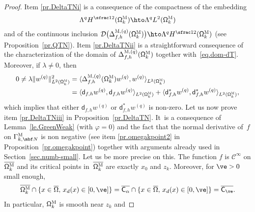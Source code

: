 \begin{proof}
Item \eqref{pr.DeltaTNi} is a consequence of the compactness
of the embedding\vspace*{-3pt}\enlargethispage{\baselineskip}
\[
\Lambda^q H^{\sfrac12} (\mathsf \Omega_k^{\textsc{M}})\hto
\Lambda^qL^{2} (\mathsf \Omega_k^{\textsc{M}})
\]
and of the
continuous inclusion $\mathcal D\bigl(\Delta_{f,h}^{\textsc{M},(q)} (\mathsf \Omega_k^{\textsc{M}})\bigr) \hto
\Lambda^qH^{\sfrac12} (\mathsf \Omega_k^{\textsc{M}})$ (see Proposition~\ref{pr.QTN}).
Item \eqref{pr.DeltaTNii} is a straightforward consequence
of the characterization of the domain of $\Delta_{f,h}^{\textsc{M},(q)} (\mathsf \Omega_k^{\textsc{M}})$
together with~\eqref{eq.dom-dT}. Moreover, if
$\lambda\neq 0$, then\vspace*{-3pt}
\begin{align*}
0 \neq \lambda\Vert w_{}^{(q)}\Vert^2_{L^{2} (\mathsf \Omega_k^{\textsc{M}})}&= \langle \Delta_{f,h}^{\textsc{M},(q)} (\mathsf \Omega_k^{\textsc{M}})w_{}^{(q)},w_{}^{(q)}\rangle_{L^{2} (\mathsf \Omega_k^{\textsc{M}})}\\
&= \langle \mathsf d_{f,h} w^{(q)},\mathsf d_{f,h}w_{}^{(q)} \rangle_{L^{2} (\mathsf \Omega_k^{\textsc{M}})} +\langle \mathsf d^{*}_{f,h}w_{}^{(q)},\mathsf d^{*}_{f,h}w_{}^{(q)} \rangle_{L^{2} (\mathsf \Omega_k^{\textsc{M}})},
\end{align*}
which implies that either $\mathsf d_{f,h}w_{}^{(q)}$ or $\mathsf d^*_{f,h}w_{}^{(q)}$ is non-zero.
Let us now prove item \eqref{pr.DeltaTNiii} in Proposition~\ref{pr.DeltaTN}. It~is
a consequence of Lemma~\ref{le.GreenWeak} (with $\varphi=0$) and the
fact that the normal derivative of~$f$ on $\Gamma_{k,\mbf
N}^{\textsc{M}}$ is non negative (see item \ref{pr.omegakpoint2} in
Proposition~\ref{pr.omegakpoint}) together with arguments already used in Section~\ref{sec.numb-small}. Let us be more precise on this. The function $f$ is $\mathcal C^\infty$ on $\overline {\mathsf \Omega_k^{\textsc{M}}}$ and its critical points in~$\overline {\mathsf \Omega_k^{\textsc{M}}}$ are exactly $x_0$ and $z_k$.
Moreover, for $\ve >0$ small enough,\vspace*{-3pt}
\begin{equation}
\label{eq.=vec}
\overline {\mathsf \Omega_k^{\textsc{M}}}\cap \{x\in \overline \Omega,\, x_d(x) \in [0,\ve]\}= \overline {\mathsf C_\alpha }\cap \{x\in \overline \Omega,\, x_d(x)\in [0,\ve]\} =\overline {\mathsf C_\ve }.
\end{equation}
In particular, $ \mathsf \Omega_k^{\textsc{M}}$ is smooth near $z_k$ and\vspace*{-3pt}

\end{proof}
